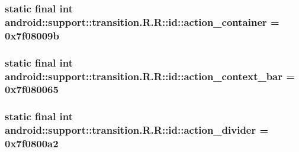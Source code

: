 \hypertarget{classandroid_1_1support_1_1transition_1_1_r_1_1id_efb2c4a79b06ca84e0f850920a80d9fa}{
\subsubsection[{action\_\-container}]{\setlength{\rightskip}{0pt plus 5cm}static final int android::support::transition.R.R::id::action\_\-container = 0x7f08009b}}
\label{classandroid_1_1support_1_1transition_1_1_r_1_1id_efb2c4a79b06ca84e0f850920a80d9fa}


\hypertarget{classandroid_1_1support_1_1transition_1_1_r_1_1id_c3220b76d6fa6d21cf6b3d7f73eece74}{
\subsubsection[{action\_\-context\_\-bar}]{\setlength{\rightskip}{0pt plus 5cm}static final int android::support::transition.R.R::id::action\_\-context\_\-bar = 0x7f080065}}
\label{classandroid_1_1support_1_1transition_1_1_r_1_1id_c3220b76d6fa6d21cf6b3d7f73eece74}


\hypertarget{classandroid_1_1support_1_1transition_1_1_r_1_1id_51cd0acdbe6d3cbaa215857f470ce7d9}{
\subsubsection[{action\_\-divider}]{\setlength{\rightskip}{0pt plus 5cm}static final int android::support::transition.R.R::id::action\_\-divider = 0x7f0800a2}}
\label{classandroid_1_1support_1_1transition_1_1_r_1_1id_51cd0acdbe6d3cbaa215857f470ce7d9}


